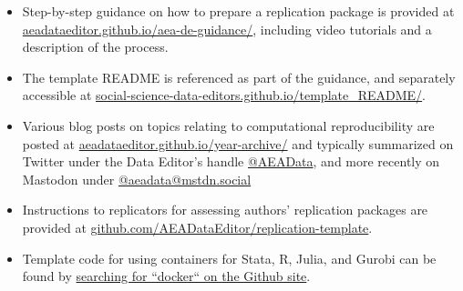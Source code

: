 \begin{itemize}
    \item Step-by-step guidance on how to prepare a replication package is provided at \href{https://aeadataeditor.github.io/aea-de-guidance/}{aeadataeditor.github.io/aea-de-guidance/}, including video tutorials and a description of the process. 
    \item The template README \citep{READMEv1.1.0} is referenced as part of the guidance, and separately accessible at \href{https://social-science-data-editors.github.io/template_README/}{social-science-data-editors.github.io/template\_README/}.
    \item Various blog posts on topics relating to computational reproducibility are posted at \href{https://aeadataeditor.github.io/year-archive/}{aeadataeditor.github.io/year-archive/} and typically summarized on Twitter under the Data Editor's handle \href{https://twitter.com/AEAData}{@AEAData}, and more recently on Mastodon under \href{https://mstdn.social/@aeadata}{@aeadata@mstdn.social}
    \item Instructions to replicators for assessing authors' replication packages are provided at \href{https://github.com/AEADataEditor/replication-template}{github.com/AEADataEditor/replication-template}.
    \item Template code for using containers for Stata, R, Julia, and Gurobi can be found by \href{https://github.com/AEADataEditor?q=docker&type=all&language=&sort=}{searching for ``docker`` on the Github site}.
    
\end{itemize}
